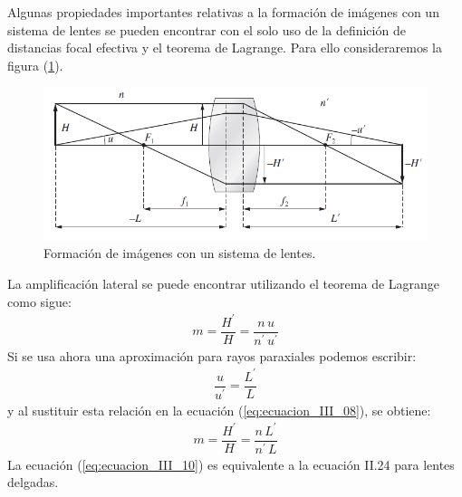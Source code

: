 \documentclass[14pt]{extarticle}
\begin{document}
Algunas propiedades importantes relativas a la formación de imágenes con un sistema
de lentes se pueden encontrar con el solo uso de la definición de distancias focal
efectiva y el teorema de Lagrange. Para ello consideraremos la figura (\ref{fig:figura_III_03}).
\begin{figure}[H]
    \centering
    \includegraphics[scale=0.7]{Imagenes/Lentes_Gruesas_03.png}
    \caption{Formación de imágenes con un sistema de lentes.}
    \label{fig:figura_III_03}
\end{figure}
La amplificación lateral se puede encontrar utilizando el teorema de Lagrange
como sigue:
\begin{align}
m = \dfrac{H^{\prime}}{H} = \dfrac{n \, u}{n^{\prime} \, u^{\prime}}
\label{eq:ecuacion_III_08}
\end{align}
Si se usa ahora una aproximación para rayos paraxiales podemos escribir:
\begin{align}
\dfrac{u}{u^{\prime}} =  \dfrac{L^{\prime}}{L}
\label{eq:ecuacion_III_09}
\end{align}
y al sustituir esta relación en la ecuación (\ref{eq:ecuacion_III_08}), se obtiene:
\begin{align}
m = \dfrac{H^{\prime}}{H} = \dfrac{n \, L^{\prime}}{n^{\prime} \, L}
\label{eq:ecuacion_III_10}
\end{align}
La ecuación (\ref{eq:ecuacion_III_10}) es equivalente a la ecuación II.24 para lentes delgadas.
\end{document}
